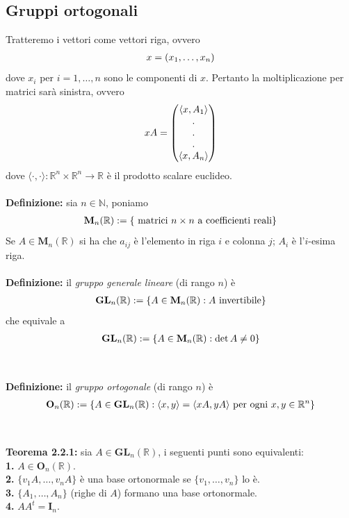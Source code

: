\documentclass{article}
\begin{document}
\subsection{Gruppi ortogonali}
Tratteremo i vettori come vettori riga, ovvero
\begin{gather}
    x = (x_1, \dots, x_n) \notag
\end{gather}
dove $x_i$ per $i = 1, \dots, n$ sono le componenti di $x$. Pertanto la moltiplicazione per matrici sarà sinistra, ovvero
\begin{gather}
    xA = \begin{pmatrix}
        \langle x, A_1 \rangle \\
        . \\
        . \\
        . \\
        \langle x, A_n \rangle
    \end{pmatrix} \notag
\end{gather}
dove $\langle \cdot, \cdot \rangle : \mathbb{R}^n \times \mathbb{R}^n \longrightarrow \mathbb{R}$ è il prodotto scalare euclideo. \\ \\
\textbf{Definizione:} sia $n \in \mathbb{N}$, poniamo
\begin{gather}
    \mathbf{M}_n(\mathbb{R}) := \{ \text{ matrici $n \times n$ a coefficienti reali} \} \notag
\end{gather}
Se $A \in \mathbf{M}_n(\mathbb{R})$ si ha che $a_{ij}$ è l'elemento in riga $i$ e colonna $j$; $A_i$ è l'$i$-esima riga. \\ \\
\textbf{Definizione:} il \textit{gruppo generale lineare} (di rango $n$) è
\begin{gather}
    \mathbf{GL}_n(\mathbb{R}) := \{ A \in \mathbf{M}_n(\mathbb{R}) : A \text{ invertibile} \} \notag
\end{gather}
che equivale a
\begin{gather}
    \mathbf{GL}_n(\mathbb{R}) := \{ A \in \mathbf{M}_n(\mathbb{R}) : \det A \neq 0 \} \notag
\end{gather} \\ \\
\textbf{Definizione:} il \textit{gruppo ortogonale} (di rango $n$) è
\begin{gather}
    \mathbf{O}_n(\mathbb{R}) := \{ A \in \mathbf{GL}_n(\mathbb{R}) : \langle x, y \rangle = \langle xA, yA \rangle \text{ per ogni } x, y \in \mathbb{R}^n \} \notag
\end{gather} \\ \\
\textbf{Teorema 2.2.1:} sia $A \in \mathbf{GL}_n(\mathbb{R})$, i seguenti punti sono equivalenti: \\
\textbf{1.} $A \in \mathbf{O}_n(\mathbb{R})$. \\
\textbf{2.} $\{ v_1A, \dots, v_nA \}$ è una base ortonormale se $\{ v_1, \dots, v_n \}$ lo è. \\
\textbf{3.} $\{ A_1, \dots, A_n \}$ (righe di $A$) formano una base ortonormale. \\
\textbf{4.} $AA^t = \mathbf{I}_n$. \\
\end{document}
